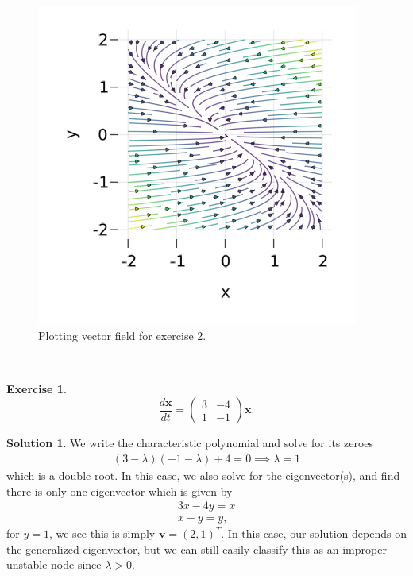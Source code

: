 \documentclass[12pt]{article}
\renewcommand{\vec}[1]{\mathbf{#1}}
\theoremstyle{definition}
\newtheorem{exer}{Exercise}
\newtheorem{sol}{Solution}
\theoremstyle{remark}
\begin{document}
\begin{figure}[h]
     \centering
     \includegraphics[width=0.8\linewidth]{figs/hw-1-exer-2.png}
     \caption{Plotting vector field for exercise 2.}%
     \label{fig:exer-2}
\end{figure}

\newpage
 
\

\newpage

\begin{exer}
\begin{equation*}
\frac{d \vec{x}}{dt} 
=
\begin{pmatrix}
    3 & -4\\
    1 & -1
\end{pmatrix}
\vec{x}.
\end{equation*}
\end{exer}

\begin{sol}\leavevmode
    We write the characteristic polynomial and solve for its zeroes 
    \begin{align*}
        (3 - \lambda)(-1 - \lambda) + 4 = 0 \implies \lambda = 1
    \end{align*}
    which is a double root. In this case, we also solve for the eigenvector(s), and find there is only one eigenvector which is given by
    \begin{align*}
    3x - 4y = x\\
    x - y = y,
    \end{align*}
    for $y = 1$, we see this is simply $\vec{v} = (2, 1)^{T}$. In this case, our solution depends on the generalized eigenvector, but we can still easily classify this as an improper unstable node since $\lambda > 0$.
 \end{sol}
\end{document}
